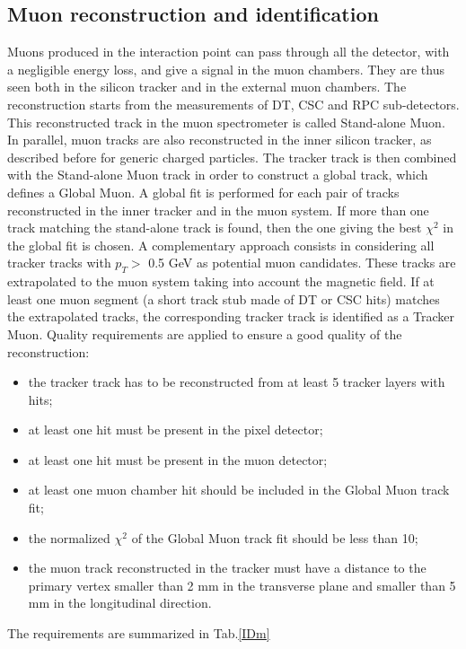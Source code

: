 \subsection*{Muon reconstruction and identification}
Muons produced in the interaction point can pass through all the detector, with a negligible energy loss, and give a signal in the muon chambers.
They are thus seen both in the silicon tracker and in the external muon chambers. 
The reconstruction starts from the measurements of DT, CSC and RPC sub-detectors. This reconstructed track in the muon spectrometer is called
Stand-alone Muon.
In parallel, muon tracks are also reconstructed in the inner silicon tracker, as described before for generic charged particles.
The tracker track is then combined with the Stand-alone Muon track in order to construct
a global track, which defines a Global Muon. A global fit is performed for each pair of
tracks reconstructed in the inner tracker and in the muon system. If more than one track
matching the stand-alone track is found, then the one giving the best $\chi^2$ in the global fit
is chosen. A complementary approach consists in considering all tracker tracks with $p_T>$ 0.5 GeV as
potential muon candidates. These tracks are extrapolated to the muon system taking
into account the magnetic field. If at least one muon segment (a short track stub made of
DT or CSC hits) matches the extrapolated tracks, the corresponding tracker track is
identified as a Tracker Muon.
Quality requirements are applied to ensure a good quality of the reconstruction:
\begin{itemize}
 \item the tracker track has to be reconstructed from at least 5 tracker layers with hits; 
 \item at least one hit must be present in the pixel detector;
 \item at least one hit must be present in the muon detector;
 \item at least one muon chamber hit should be included in the Global Muon track fit;
 \item the normalized $\chi^2$ of the Global Muon track fit should be less than 10;
 \item the muon track reconstructed in the tracker must have a distance to the primary
vertex smaller than 2 mm in the transverse plane and smaller than 5 mm in
the longitudinal direction.
\end{itemize}
The requirements are summarized in Tab.\ref{IDm}


